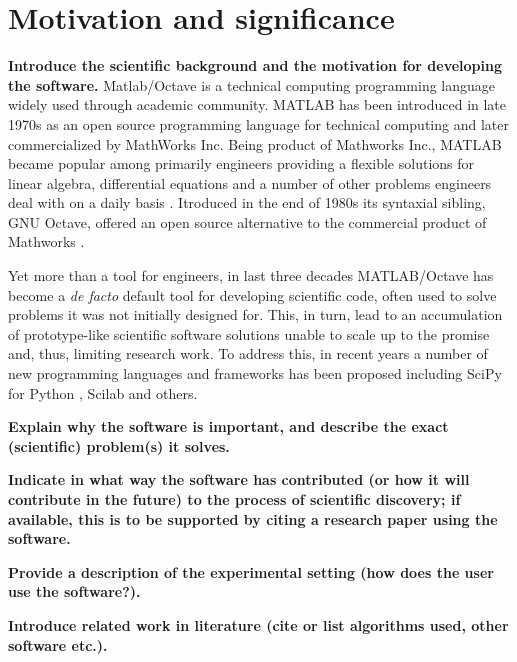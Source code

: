 \section{Motivation and significance}
\label{} 

\textbf{Introduce the scientific background and the motivation for developing the software.}
Matlab/Octave is a technical computing programming language widely used through academic community. MATLAB has been introduced in late 1970s as an open source programming language for technical computing and later commercialized by MathWorks Inc. Being product of Mathworks Inc., MATLAB became popular among primarily engineers providing a flexible solutions for linear algebra, differential equations and a number of other problems engineers deal with on a daily basis \cite{moore2014matlab}. Itroduced in the end of 1980s its syntaxial sibling, GNU Octave, offered an open source alternative to the commercial product of Mathworks \cite{eaton1997gnu}.

Yet more than a tool for engineers, in last three decades MATLAB/Octave has become a \textit{de facto} default tool for developing scientific code, often used to solve problems it was not initially designed for. This, in turn, lead to an accumulation of prototype-like scientific software solutions unable to scale up to the promise and, thus, limiting research work. To address this, in recent years a number of new programming languages and frameworks has been proposed including SciPy for Python \cite{jones2014scip,Olivier_2002}, Scilab and others. 

\textbf{Explain why the software is important, and describe the exact (scientific) problem(s) it solves.}


\textbf{Indicate in what way the software has contributed (or how it will contribute in the future) to the process of scientific discovery; if available, this is to be supported by citing a research paper using the software.}


\textbf{Provide a description of the experimental setting (how does the user use the software?).}


\textbf{Introduce related work in literature (cite or list algorithms used, other software etc.).}

    
    
    
    